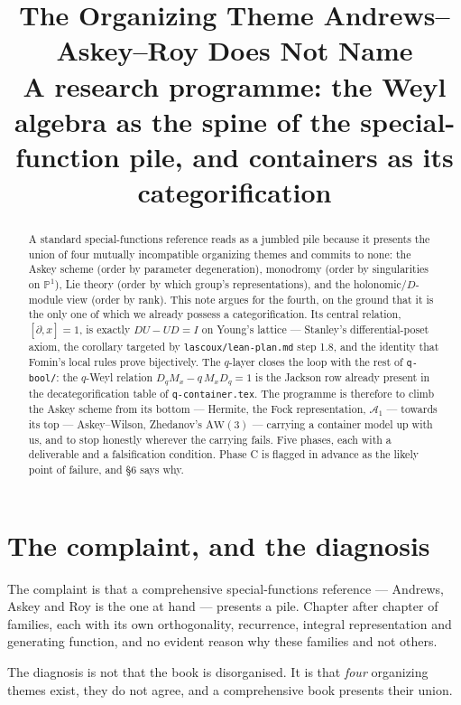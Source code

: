 \documentclass[11pt,a4paper]{article}
\title{\bfseries The Organizing Theme Andrews--Askey--Roy Does Not Name\\[0.4em]
\large A research programme: the Weyl algebra as the spine of the special-function
pile, and containers as its categorification}
\author{}
\date{}
\theoremstyle{definition}
\theoremstyle{remark}
\newcommand{\AW}{\mathrm{AW}(3)}
\newcommand{\Weyl}{\mathcal{A}_1}
\begin{document}
\maketitle

\begin{abstract}
A standard special-functions reference reads as a jumbled pile because it presents the
union of four mutually incompatible organizing themes and commits to none: the Askey
scheme (order by parameter degeneration), monodromy (order by singularities on
$\mathbb{P}^1$), Lie theory (order by which group's representations), and the
holonomic/$D$-module view (order by rank). This note argues for the fourth, on the
ground that it is the only one of which we already possess a categorification. Its
central relation, $[\partial, x] = 1$, is exactly $DU - UD = I$ on Young's lattice ---
Stanley's differential-poset axiom, the corollary targeted by
\texttt{lascoux/lean-plan.md} step 1.8, and the identity that Fomin's local rules
prove bijectively. The $q$-layer closes the loop with the rest of
\texttt{q-bool/}: the $q$-Weyl relation $D_q M_x - q\,M_x D_q = 1$ is the Jackson row
already present in the decategorification table of \texttt{q-container.tex}. The
programme is therefore to climb the Askey scheme from its bottom --- Hermite, the Fock
representation, $\Weyl$ --- towards its top --- Askey--Wilson, Zhedanov's $\AW$ ---
carrying a container model up with us, and to stop honestly wherever the carrying
fails. Five phases, each with a deliverable and a falsification condition. Phase C is
flagged in advance as the likely point of failure, and \S6 says why.
\end{abstract}

\tableofcontents

\section{The complaint, and the diagnosis}

The complaint is that a comprehensive special-functions reference --- Andrews, Askey
and Roy \cite{AAR} is the one at hand --- presents a pile. Chapter after chapter of
families, each with its own orthogonality, recurrence, integral representation and
generating function, and no evident reason why these families and not others.

The diagnosis is not that the book is disorganised. It is that \emph{four} organizing
themes exist, they do not agree, and a comprehensive book presents their union.
\end{document}
